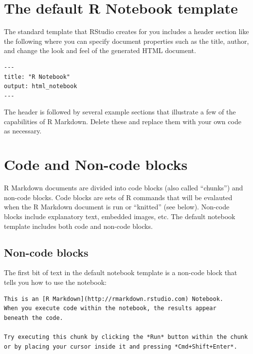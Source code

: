 \documentclass[]{book}
\theoremstyle{definition}
\theoremstyle{definition}
\theoremstyle{definition}
\theoremstyle{remark}
\begin{document}
\hypertarget{the-default-r-notebook-template}{%
\section{The default R Notebook
template}\label{the-default-r-notebook-template}}

The standard template that RStudio creates for you includes a header
section like the following where you can specify document properties
such as the title, author, and change the look and feel of the generated
HTML document.

\begin{verbatim}
---
title: "R Notebook"
output: html_notebook
---
\end{verbatim}

The header is followed by several example sections that illustrate a few
of the capabilities of R Markdown. Delete these and replace them with
your own code as necessary.

\hypertarget{code-and-non-code-blocks}{%
\section{Code and Non-code blocks}\label{code-and-non-code-blocks}}

R Markdown documents are divided into code blocks (also called
``chunks'') and non-code blocks. Code blocks are sets of R commands that
will be evalauted when the R Markdown document is run or ``knitted''
(see below). Non-code blocks include explanatory text, embedded images,
etc. The default notebook template includes both code and non-code
blocks.

\hypertarget{non-code-blocks}{%
\subsection{Non-code blocks}\label{non-code-blocks}}

The first bit of text in the default notebook template is a non-code
block that tells you how to use the notebook:

\begin{verbatim}
This is an [R Markdown](http://rmarkdown.rstudio.com) Notebook. 
When you execute code within the notebook, the results appear
beneath the code. 

Try executing this chunk by clicking the *Run* button within the chunk 
or by placing your cursor inside it and pressing *Cmd+Shift+Enter*. 
\end{verbatim}
\end{document}
